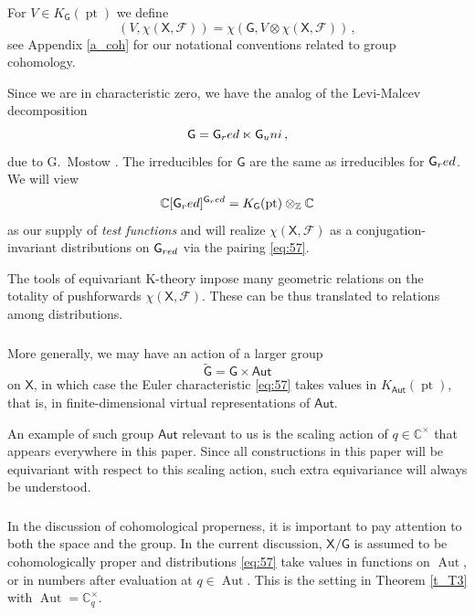 \documentclass[14pt]{extarticle}
\newcommand{\C}{\mathbb{C}}
\newcommand{\Ct}{\mathbb{C}^\times}
\newcommand{\Z}{\mathbb{Z}}
\newcommand{\bG}{\mathsf{G}}
\newcommand{\bGt}{{\widetilde{\mathsf{G}}}}
\newcommand{\bX}{\mathsf{X}}
\newcommand{\cF}{\mathscr{F}}
\newcommand{\uni}{\textup{uni}}
\newcommand{\red}{\textup{red}}
\newcommand{\bAut}{\mathsf{Aut}}
\DeclareMathOperator{\Aut}{Aut}
\DeclareMathOperator{\pt}{pt}
\theoremstyle{definition}
\begin{document}
For $V \in K_\bG(\pt)$ we define 
%
\begin{equation}
(V, \chi(\bX,\cF))  = \chi(\bG, V\otimes \chi(\bX,\cF)) 
\,, \label{eq:57}
\end{equation}
%
see Appendix \ref{a_coh} for our notational conventions related to
group cohomology.

Since we are in characteristic zero, we have the analog
of the Levi-Malcev decomposition
%
\begin{equation}
\bG = \bG_\red \ltimes \bG_\uni\,,\label{Most}
\end{equation}
%
due to G.~Mostow \cite{Mostow}. The irreducibles for $\bG$ are the
same as irreducibles for $\bG_\red$. We will view
\[
  \C[\bG_\red]^{\bG_\red} = K_\bG(\pt) \otimes_\Z \C
\]
as our supply of \emph{test functions} and will realize $\chi(\bX,\cF)$
as a conjugation-invariant distributions on
$\bG_{\textup{red}}$ via the pairing \eqref{eq:57}. 

The tools of equivariant K-theory impose many
geometric relations on the totality of pushforwards $\chi(\bX,\cF)$.
These can be thus translated to relations among distributions.


\subsubsection{}

More generally, we may have an action of a larger group 
%
\begin{equation}
  \label{eq:173}
  \bGt = \bG \times \bAut
\end{equation}
%
on $\bX$, in which case the Euler characteristic \eqref{eq:57}
takes values in $K_{\bAut}(\pt)$, that is, in 
finite-dimensional virtual representations of $\bAut$. 

An example of such group $\bAut$ relevant to us
is the scaling action of $q\in \Ct$
that appears everywhere in this paper. Since all constructions
in this paper will be equivariant with respect to this scaling action,
such extra equivariance will always be understood.

\subsubsection{}


In the discussion of cohomological properness, it is important to pay
attention to both the space and the group. In the current discussion,
$\bX/\bG$ is assumed to be cohomologically proper and
distributions \eqref{eq:57}  take values in functions on $\Aut$, or in numbers
after evaluation at $q\in \Aut$. This is the
setting in Theorem \ref{t_T3} with $\Aut=\Ct_q$.
\end{document}
